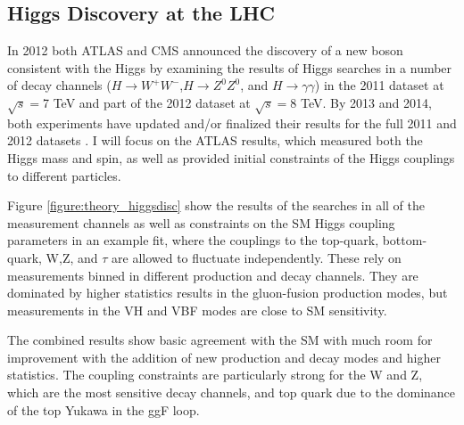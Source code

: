 \subsection{Higgs Discovery at the LHC}

In 2012 both ATLAS and CMS announced the discovery of a new boson consistent
with the Higgs by examining the results of Higgs searches in a number of decay
channels ($H\rightarrow W^+W^-$,$H\rightarrow Z^0Z^0$, and
    $H\rightarrow\gamma\gamma$) in the 2011 dataset at $\sqrt{s}=$7 TeV and
part of the 2012 dataset at $\sqrt{s}=$8 TeV. By 2013 and 2014, both
experiments have updated and/or finalized their results for the full 2011 and
2012 datasets \cite{ATLAS-CONF-2014-009,CMS-PAS-HIG-14-009}. I will focus on the ATLAS results, 
which measured both the Higgs mass\cite{Aad:2014aba} and spin\cite{tagkey2013120}, as well as 
provided initial constraints of the Higgs couplings to different particles. 

Figure \ref{figure:theory_higgsdisc} show the results of the searches in all of the
measurement channels as well as constraints on the SM Higgs coupling parameters in 
an example fit, where the couplings to the top-quark, bottom-quark, W,Z, and $\tau$
are allowed to fluctuate independently. These rely on measurements binned in different
production and decay channels. They are dominated by higher statistics results in the 
gluon-fusion production modes, but measurements in the VH and VBF modes are close to 
SM sensitivity. 

The combined results show basic agreement with the SM with much room for improvement
with the addition of new production and decay modes and higher statistics. The 
coupling constraints are particularly strong for the W and Z, which are
the most sensitive decay channels, and top quark due to the dominance of the
top Yukawa in the ggF loop. 


